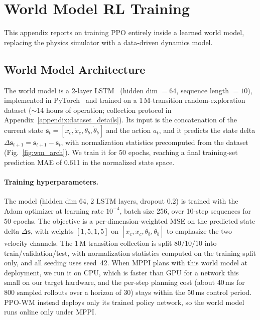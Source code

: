 \section{World Model RL Training}\label{appendix:world_model}

This appendix reports on training PPO entirely inside a learned world model,
replacing the physics simulator with a data-driven dynamics model.

\subsection{World Model Architecture}

The world model is a 2-layer LSTM~\cite{hochreiter1997lstm}
(hidden dim $= 64$, sequence length $= 10$), implemented in
PyTorch~\cite{paszke2019pytorch} and trained on a 1\,M-transition
random-exploration dataset ($\sim$14 hours of operation; collection protocol
in Appendix~\ref{appendix:dataset_details}). Its input is the
concatenation of the current state
$\mathbf{s}_t = [x_c, \dot{x}_c, \theta_b, \dot{\theta}_b]$ and the action
$a_t$, and it predicts the state delta
$\Delta\mathbf{s}_{t+1} = \mathbf{s}_{t+1} - \mathbf{s}_t$, with normalization
statistics precomputed from the dataset (Fig.~\ref{fig:wm_arch}). We train it
for 50 epochs, reaching a final training-set prediction MAE of 0.611 in the
normalized state space.

\paragraph{Training hyperparameters.}
The model (hidden dim 64, 2 LSTM layers, dropout 0.2) is trained with the
Adam optimizer at learning rate $10^{-4}$, batch size 256, over
10-step sequences for 50 epochs. The objective is a per-dimension-weighted MSE
on the predicted state delta $\Delta\mathbf{s}$, with weights $[1, 5, 1, 5]$
on $[x_c, \dot{x}_c, \theta_b, \dot{\theta}_b]$ to emphasize the two velocity
channels. The 1\,M-transition collection is split $80/10/10$ into
train/validation/test, with normalization statistics computed on the training
split only, and all seeding uses seed~42. When MPPI plans with
this world model at deployment, we run it on CPU, which is faster than GPU for
a network this small on our target hardware, and the per-step planning cost
(about 40\,ms for 800 sampled rollouts over a horizon of 30) stays within the
50\,ms control period. PPO-WM instead deploys only its trained policy network,
so the world model runs online only under MPPI.

